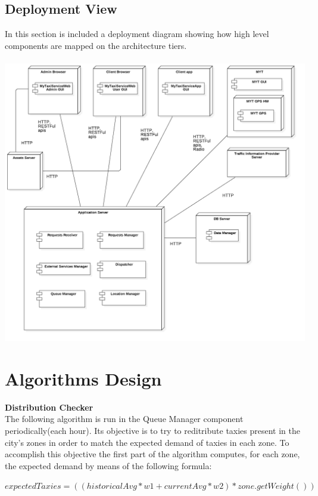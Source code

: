 \documentclass[11pt,titlepage]{article} %
\begin{document}
\newpage

\subsection{Deployment View}
In this section is included a deployment diagram showing how high level components are mapped on the architecture tiers.\newline
\hfill \\
\hfill \\
\includegraphics[scale=0.4]{deployment.png}

\newpage

\section{Algorithms Design}
\textbf{Distribution Checker} \hfill \\
The following algorithm is run in the Queue Manager component periodically(each hour).
  Its objective is to try to reditribute taxies present in the city's zones in order
  to match the expected demand of taxies in each zone.
  To accomplish this objective the first part of the algorithm computes, for each zone,
  the expected demand by means of the following formula:\newline

    $ expectedTaxies = ((historicalAvg*w1+currentAvg*w2)*zone.getWeight()) $\newline
\end{document}
